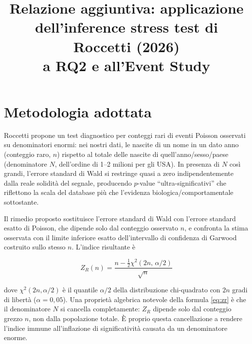 \documentclass[conference]{IEEEtran}
\begin{document}
\title{Relazione aggiuntiva: applicazione dell'inference stress test di Roccetti (2026)\\a RQ2 e all'Event Study}

\author{
\and
{}
}

\maketitle

\section{Metodologia adottata}

Roccetti \cite{roccetti2026} propone un test diagnostico per conteggi rari di eventi Poisson
osservati su denominatori enormi: nei nostri dati, le nascite di un nome in un dato anno
(conteggio raro, $n$) rispetto al totale delle nascite di quell'anno/sesso/paese (denominatore
$N$, dell'ordine di 1--2 milioni per gli USA). In presenza di $N$ così grandi, l'errore standard
di Wald si restringe quasi a zero indipendentemente dalla reale solidità del segnale, producendo
$p$-value ``ultra-significativi'' che riflettono la scala del database più che l'evidenza
biologica/comportamentale sottostante.

Il rimedio proposto sostituisce l'errore standard di Wald con l'errore standard esatto di
Poisson, che dipende solo dal conteggio osservato $n$, e confronta la stima osservata con il
limite inferiore esatto dell'intervallo di confidenza di Garwood \cite{garwood1936} costruito
sullo stesso $n$. L'indice risultante è

\begin{equation}
Z_R(n) = \frac{n - \tfrac{1}{2}\chi^2(2n,\, \alpha/2)}{\sqrt{n}}
\label{eq:zr}
\end{equation}

dove $\chi^2(2n, \alpha/2)$ è il quantile $\alpha/2$ della distribuzione chi-quadrato con $2n$
gradi di libertà ($\alpha = 0{,}05$). Una proprietà algebrica notevole della formula
\eqref{eq:zr} è che il denominatore $N$ si cancella completamente: $Z_R$ dipende solo dal
conteggio grezzo $n$, non dalla popolazione totale. È proprio questa cancellazione a rendere
l'indice immune all'inflazione di significatività causata da un denominatore enorme.
\end{document}
